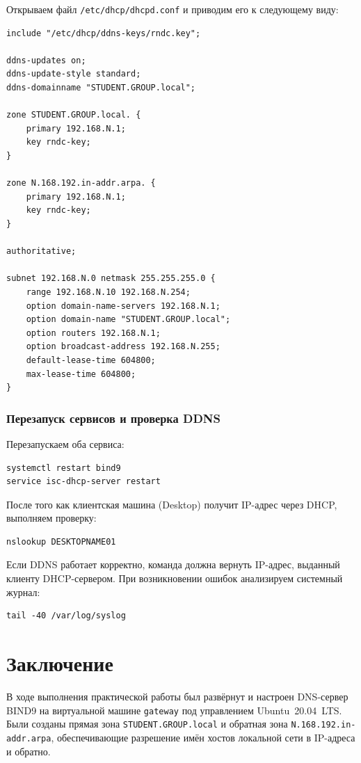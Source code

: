 \documentclass[a4paper,14pt,oneside,openany]{memoir}
\begin{document}
Открываем файл \texttt{/etc/dhcp/dhcpd.conf} и приводим его к следующему виду:
\begin{lstlisting}
include "/etc/dhcp/ddns-keys/rndc.key";

ddns-updates on;
ddns-update-style standard;
ddns-domainname "STUDENT.GROUP.local";

zone STUDENT.GROUP.local. {
    primary 192.168.N.1;
    key rndc-key;
}

zone N.168.192.in-addr.arpa. {
    primary 192.168.N.1;
    key rndc-key;
}

authoritative;

subnet 192.168.N.0 netmask 255.255.255.0 {
    range 192.168.N.10 192.168.N.254;
    option domain-name-servers 192.168.N.1;
    option domain-name "STUDENT.GROUP.local";
    option routers 192.168.N.1;
    option broadcast-address 192.168.N.255;
    default-lease-time 604800;
    max-lease-time 604800;
}
\end{lstlisting}

\subsection{Перезапуск сервисов и проверка DDNS}

Перезапускаем оба сервиса:
\begin{lstlisting}
systemctl restart bind9
service isc-dhcp-server restart
\end{lstlisting}

После того как клиентская машина (Desktop) получит IP-адрес через DHCP, выполняем проверку:
\begin{lstlisting}
nslookup DESKTOPNAME01
\end{lstlisting}

Если DDNS работает корректно, команда должна вернуть IP-адрес, выданный клиенту DHCP-сервером. При возникновении ошибок анализируем системный журнал:
\begin{lstlisting}
tail -40 /var/log/syslog
\end{lstlisting}

\chapter*{Заключение}
\label{ch:conclusion}

В ходе выполнения практической работы был развёрнут и настроен DNS-сервер BIND9 на виртуальной машине \texttt{gateway} под управлением Ubuntu~20.04~LTS. Были созданы прямая зона \texttt{STUDENT.GROUP.local} и обратная зона \texttt{N.168.192.in-addr.arpa}, обеспечивающие разрешение имён хостов локальной сети в IP-адреса и обратно.
\end{document}
